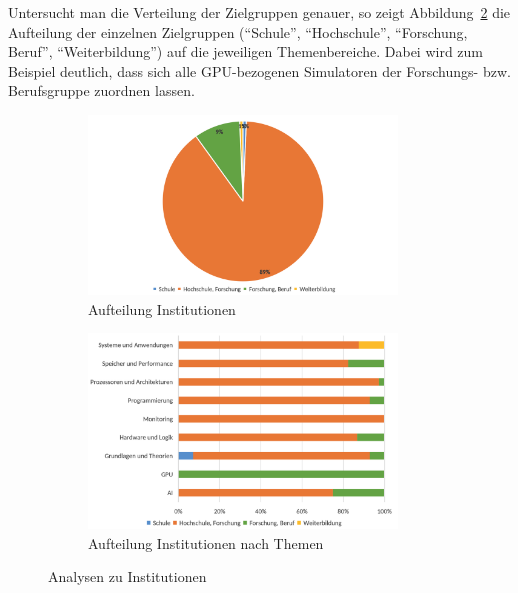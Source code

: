 Untersucht man die Verteilung der Zielgruppen genauer, so zeigt Abbildung~\ref{fig:10-institution-themen} die Aufteilung der einzelnen Zielgruppen (\enquote{Schule}, \enquote{Hochschule}, \enquote{Forschung, Beruf}, \enquote{Weiterbildung}) auf die jeweiligen Themenbereiche. Dabei wird zum Beispiel deutlich, dass sich alle GPU-bezogenen Simulatoren der Forschungs- bzw. Berufsgruppe zuordnen lassen.

\begin{figure}[!htbp]
    \centering
    \begin{subfigure}[b]{0.48\textwidth}
        \centering
        \includegraphics[width=0.90\textwidth]{graphics_lit/9-institution.png}
        \caption{Aufteilung Institutionen}
        \label{fig:9-institution}
    \end{subfigure}
    \hfill
    \begin{subfigure}[b]{0.48\textwidth}
        \centering
        \includegraphics[width=0.90\textwidth]{graphics_lit/10-institution-themen.png}
        \caption{Aufteilung Institutionen nach Themen}
        \label{fig:10-institution-themen}
    \end{subfigure}
    \caption{Analysen zu Institutionen}
    \label{fig:institution-analysen}
\end{figure}

